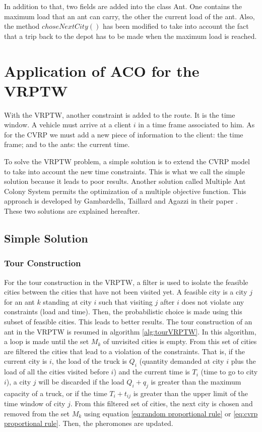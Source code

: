 In addition to that, two fields are added into the class Ant. One contains the maximum load that an ant can carry, the other the current load of the ant. Also, the method $choseNextCity()$ has been modified to take into account the fact that a trip back to the depot has to be made when the maximum load is reached.

\section{Application of ACO for the VRPTW}\label{applivrptw}
With the VRPTW, another constraint is added to the route. It is the time window. A vehicle must arrive at a client $i$ in a time frame associated to him. As for the CVRP we must add a new piece of information to the client: the time frame; and to the ants: the current time.

To solve the VRPTW problem, a simple solution is to extend the CVRP model to take into account the new time constraints. This is what we call the simple solution because it leads to poor results. Another solution called Multiple Ant Colony System permits the optimization of a multiple objective function. This approach is developed by Gambardella, Taillard and Agazzi in their paper \cite{gambardella1999macs}. These two solutions are explained hereafter.
\subsection{Simple Solution}\label{naivevrptw}

\subsubsection{Tour Construction}

For the tour construction in the VRPTW, a filter is used to isolate the feasible cities between the cities that have not been visited yet. A feasible city is a city $j$ for an ant $k$ standing at city $i$ such that visiting $j$ after $i$ does not violate any constraints (load and time). Then, the probabilistic choice is made using this subset of feasible cities. This leads to better results. The tour construction of an ant in the VRPTW is resumed in algorithm \ref{alg:tourVRPTW}. In this algorithm, a loop is made until the set \texttt{$M_k$} of unvisited cities is empty. From this set of cities are filtered the cities that lead to a violation of the constraints. That is, if the current city is $i$, the load of the truck is $Q_i$ (quantity demanded at city $i$ plus the load of all the cities visited before $i$) and the current time is $T_i$ (time to go to city $i$), a city $j$ will be discarded if the load $Q_i + q_j$ is greater than the maximum capacity of a truck, or if the time $T_i + t_{ij}$ is greater than the upper limit of the time window of city $j$. From this filtered set of cities, the next city is chosen and removed from the set $M_k$ using equation \ref{eq:random proportional rule} or \ref{eq:cvrp proportional rule}. Then, the pheromones are updated. 

